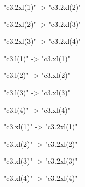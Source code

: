 {{    "c3.2xl(1)" -> "c3.2xl(2)"

    "c3.2xl(2)" -> "c3.2xl(3)"

    "c3.2xl(3)" -> "c3.2xl(4)"
    
  
  "c3.l(1)" -> "c3.xl(1)"
   
  "c3.l(2)" -> "c3.xl(2)"
  
  "c3.l(3)" -> "c3.xl(3)"
  
  "c3.l(4)" -> "c3.xl(4)" 
  
  "c3.xl(1)" -> "c3.2xl(1)" 
  
  "c3.xl(2)" -> "c3.2xl(2)"
  
  "c3.xl(3)" -> "c3.2xl(3)"
  
  "c3.xl(4)" -> "c3.2xl(4)"

  }
  
}